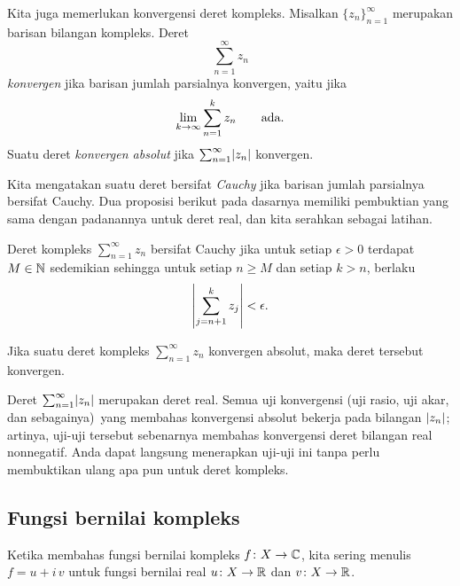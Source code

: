 Kita juga memerlukan konvergensi deret kompleks. Misalkan $\{ z_n \}_{n=1}^\infty$ merupakan
barisan bilangan kompleks. Deret
\begin{equation*}
\sum_{n=1}^\infty z_n
\end{equation*}
\emph{konvergen} jika barisan jumlah parsialnya konvergen, yaitu jika
\begin{equation*}
\lim_{k\to\infty} \sum_{n=1}^k z_n \qquad \text{ada.}
\avoidbreak
\end{equation*}
Suatu deret \emph{konvergen absolut}
jika $\sum_{n=1}^\infty \lvert {z_n} \rvert$ konvergen.

Kita mengatakan suatu deret
bersifat \emph{Cauchy}
jika barisan jumlah parsialnya bersifat Cauchy. Dua
proposisi berikut pada dasarnya memiliki pembuktian yang sama
dengan padanannya untuk deret real, dan
kita serahkan sebagai latihan.

\begin{prop} \label{prop:cachysercomplex}
Deret kompleks $\sum_{n=1}^\infty z_n$ bersifat Cauchy jika untuk setiap $\epsilon > 0$
terdapat $M \in {\mathbb{N}}$ sedemikian sehingga untuk setiap $n \geq M$
dan setiap $k > n$, berlaku
\begin{equation*}
\left\lvert { \sum_{j={n+1}}^k z_j } \right\rvert
< \epsilon .
\end{equation*}
\end{prop}

\begin{prop} \label{prop:absconvmeansconv}
Jika suatu deret kompleks $\sum_{n=1}^\infty z_n$ konvergen absolut, maka deret tersebut konvergen.
\end{prop}

Deret $\sum_{n=1}^\infty \lvert {z_n} \rvert$ merupakan deret real. Semua
uji konvergensi (uji rasio, uji akar, dan sebagainya)\ yang membahas
konvergensi absolut bekerja pada bilangan $\lvert {z_n} \rvert$; artinya, uji-uji tersebut
sebenarnya membahas konvergensi deret bilangan real nonnegatif.
Anda dapat langsung menerapkan uji-uji ini
tanpa perlu membuktikan ulang apa pun untuk deret kompleks.

\subsection{Fungsi bernilai kompleks}

Ketika membahas fungsi bernilai kompleks
$f \colon X \to {\mathbb{C}}$, kita sering menulis
$f = u+i\,v$ untuk fungsi bernilai real $u \colon X \to {\mathbb{R}}$ dan $v \colon X \to
{\mathbb{R}}$.

